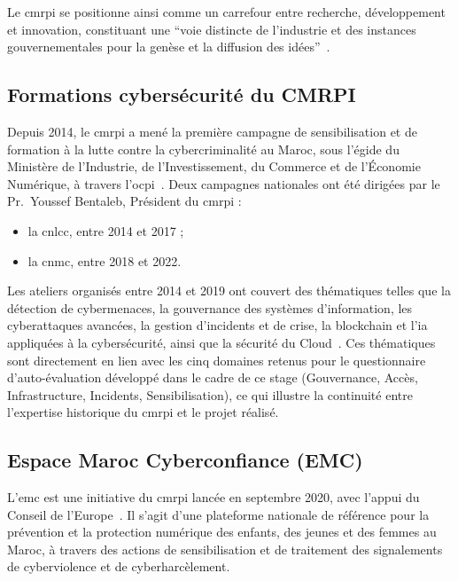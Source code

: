 Le \gls{cmrpi} se positionne ainsi comme un carrefour entre recherche, développement et innovation, constituant une \enquote{voie distincte de l'industrie et des instances gouvernementales pour la genèse et la diffusion des idées}~\cite{cmrpirapport2019}.

\subsection{Formations cybersécurité du CMRPI}

Depuis 2014, le \gls{cmrpi} a mené la première campagne de sensibilisation et de formation à la lutte contre la cybercriminalité au Maroc, sous l'égide du Ministère de l'Industrie, de l'Investissement, du Commerce et de l'Économie Numérique, à travers l'\gls{ocpi}~\cite{cmrpicatalogue2021}. Deux campagnes nationales ont été dirigées par le Pr.~Youssef Bentaleb, Président du \gls{cmrpi} :

\begin{itemize}
  \item la \gls{cnlcc}, entre 2014 et 2017 ;
  \item la \gls{cnmc}, entre 2018 et 2022.
\end{itemize}

Les ateliers organisés entre 2014 et 2019 ont couvert des thématiques telles que la détection de cybermenaces, la gouvernance des systèmes d'information, les cyberattaques avancées, la gestion d'incidents et de crise, la blockchain et l'\gls{ia} appliquées à la cybersécurité, ainsi que la sécurité du Cloud~\cite{cmrpicatalogue2021}. Ces thématiques sont directement en lien avec les cinq domaines retenus pour le questionnaire d'auto-évaluation développé dans le cadre de ce stage (Gouvernance, Accès, Infrastructure, Incidents, Sensibilisation), ce qui illustre la continuité entre l'expertise historique du \gls{cmrpi} et le projet réalisé.

\subsection{Espace Maroc Cyberconfiance (EMC)}

L'\gls{emc} est une initiative du \gls{cmrpi} lancée en septembre 2020, avec l'appui du Conseil de l'Europe~\cite{emcrapport2021}. Il s'agit d'une plateforme nationale de référence pour la prévention et la protection numérique des enfants, des jeunes et des femmes au Maroc, à travers des actions de sensibilisation et de traitement des signalements de cyberviolence et de cyberharcèlement.

